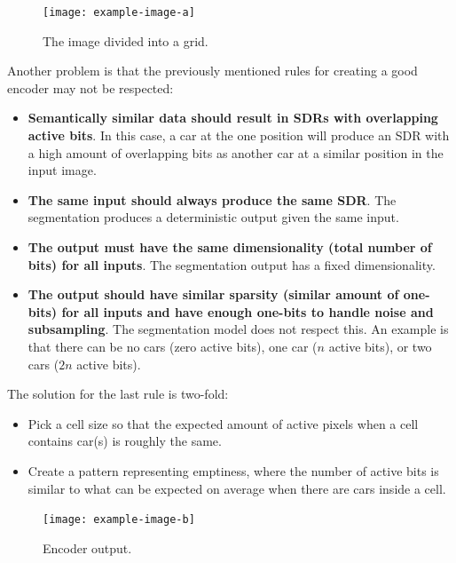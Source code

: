 \begin{figure}[H]
    \centering
    \texttt{[image: example-image-a]}
    \caption{The image divided into a grid.}
    \label{fig:grid}
\end{figure}
Another problem is that the previously mentioned rules for creating a good encoder may not be respected:
\begin{itemize}
    \item \textbf{Semantically similar data should result in SDRs with overlapping active bits}. In this case, a car at the one position will produce an SDR with a high amount of overlapping bits as another car at a similar position in the input image.
    \item \textbf{The same input should always produce the same SDR}. The segmentation produces a deterministic output given the same input.
    \item \textbf{The output must have the same dimensionality (total number of bits) for all inputs}. The segmentation output has a fixed dimensionality.
    \item \textbf{The output should have similar sparsity (similar amount of one-bits) for all inputs and have enough one-bits to handle noise and subsampling}. The segmentation model does not respect this. An example is that there can be no cars (zero active bits), one car ($n$ active bits), or two cars ($2n$ active bits).
\end{itemize}
The solution for the last rule is two-fold:
\begin{itemize}
    \item Pick a cell size so that the expected amount of active pixels when a cell contains car(s) is roughly the same.
    \item Create a pattern representing emptiness, where the number of active bits is similar to what can be expected on average when there are cars inside a cell.
\end{itemize}
\begin{figure}[H]
    \centering
    \texttt{[image: example-image-b]}
    \caption{Encoder output.}
    \label{fig:encoder_output}
\end{figure}

